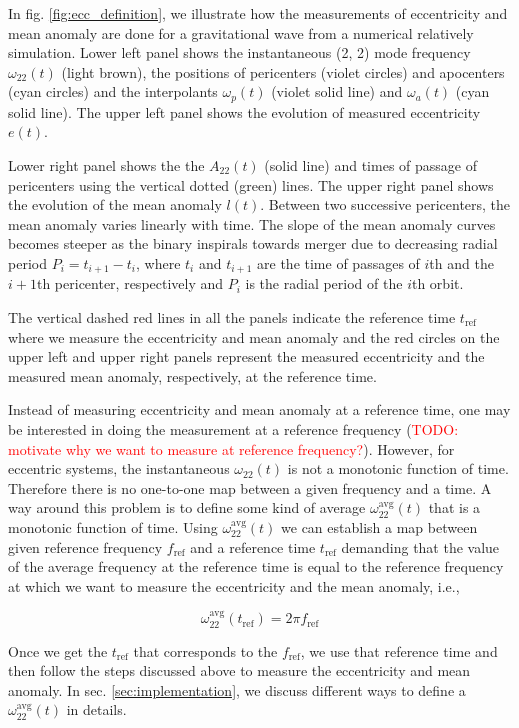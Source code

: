 \documentclass[aps,prd,amsmath,floats,floatfix, twocolumn,
superscriptaddress,nofootinbib,showpacs]{revtex4-1}
\newcommand{\red}{\textcolor{red}}
\newcommand{\TODO}[1]{\red{TODO: #1}}
\newcommand{\avgOmega}{\omega^{\text{avg}}_{22}}
\newcommand{\tref}{t_{\text{ref}}}
\newcommand{\fref}{f_{\text{ref}}}
\begin{document}
In fig. \ref{fig:ecc_definition}, we illustrate how the measurements
of eccentricity and mean anomaly are done for a gravitational wave
from a numerical relatively simulation. Lower left panel shows the
instantaneous (2, 2) mode frequency $\omega_{22}(t)$ (light brown),
the positions of pericenters (violet circles) and apocenters (cyan
circles) and the interpolants $\omega_p(t)$ (violet solid line) and
$\omega_a(t)$ (cyan solid line). The upper left panel shows the
evolution of measured eccentricity $e(t)$.

Lower right panel shows the the $A_{22}(t)$ (solid line) and times of
passage of pericenters using the vertical dotted (green) lines. The
upper right panel shows the evolution of the mean anomaly
$l(t)$. Between two successive pericenters, the mean anomaly varies
linearly with time. The slope of the mean anomaly curves becomes
steeper as the binary inspirals towards merger due to decreasing
radial period $P_{i} = t_{i+1} - t_i$, where $t_{i}$ and $t_{i+1}$ are
the time of passages of $i$th and the $i+1$th pericenter, respectively
and $P_i$ is the radial period of the $i$th orbit.

The vertical dashed red lines in all the panels indicate the reference
time $\tref$ where we measure the eccentricity and mean
anomaly and the red circles on the upper left and upper right panels
represent the measured eccentricity and the measured mean anomaly,
respectively, at the reference time.

Instead of measuring eccentricity and mean anomaly at a reference
time, one may be interested in doing the measurement at a reference
frequency (\TODO{motivate why we want to measure at reference
frequency?}). However, for eccentric systems, the instantaneous
$\omega_{22}(t)$ is not a monotonic function of time. Therefore there
is no one-to-one map between a given frequency and a time. A way
around this problem is to define some kind of average
$\avgOmega(t)$ that is a monotonic function of
time. Using $\avgOmega(t)$ we can establish a map
between given reference frequency $\fref$ and a reference
time $\tref$ demanding that the value of the average
frequency at the reference time is equal to the reference frequency at
which we want to measure the eccentricity and the mean anomaly, i.e.,

\begin{equation}
  \label{eq:map-between-ref-freq-and-ref-time}
  \avgOmega(\tref) = 2 \pi \fref
\end{equation}

Once we get the $\tref$ that corresponds to the
$\fref$, we use that reference time and then follow the steps
discussed above to measure the eccentricity and mean anomaly. In
sec. \ref{sec:implementation}, we discuss different ways to define a
$\avgOmega(t)$ in details.
\end{document}
